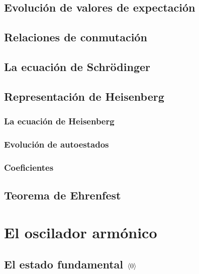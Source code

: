 \documentclass[10pt,oneside]{CBFT_book}
\begin{document}
\subsection{Evolución de valores de expectación}

\subsection{Relaciones de conmutación}

\subsection{La ecuación de Schrödinger}

\subsection{Representación de Heisenberg}

\subsubsection{La ecuación de Heisenberg}

\subsubsection{Evolución de autoestados}

\subsubsection{Coeficientes}

\subsection{Teorema de Ehrenfest}


% 
\section{El oscilador armónico}

\subsection{El estado fundamental $\Braket{0}$}
\end{document}
